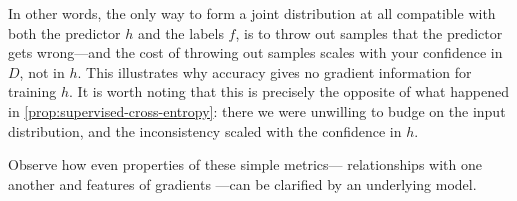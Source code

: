 \documentclass[twoside]{article}
\theoremstyle{plain}
\newtheorem{prop}[theorem]{Proposition}
\theoremstyle{definition}
\begin{document}
In other words, the only way to form a joint distribution at all compatible with both the predictor $h$ and the labels $f$, is to throw out samples that the predictor gets wrong---and the cost of throwing out samples scales with your confidence in $D$, not in $h$.
This illustrates why accuracy gives no gradient information for training $h$.
It is worth noting that this is precisely
the opposite of what happened in \cref{prop:supervised-cross-entropy}: there we were unwilling to budge on the input distribution, and 
the inconsistency scaled with the confidence in $h$.
%

Observe how even properties of these simple metrics---%
relationships with one another and features of gradients%
	---can be clarified by an underlying model.


\end{document}
